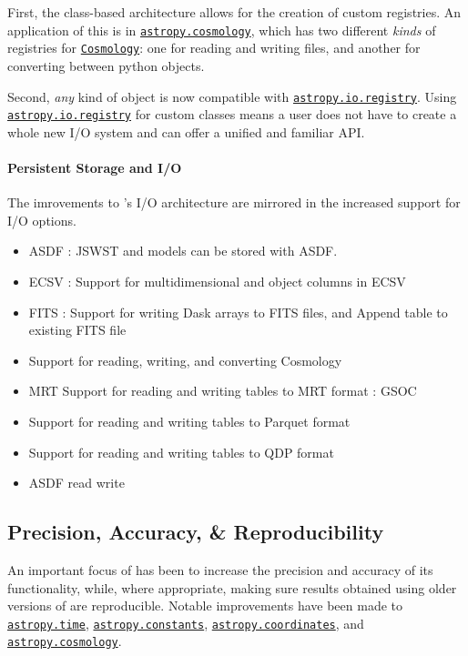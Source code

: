 \documentclass[modern]{aastex631}
\newcommand{\astropysubpkg}[1]{\href{http://docs.astropy.org/en/stable/#1/index.html}{\texttt{astropy.#1}}\xspace}
\newcommand{\astropyiosubpkg}[1]{\href{http://docs.astropy.org/en/stable/io/#1/index.html}{\texttt{astropy.io.#1}}\xspace}
\newcommand{\astropycosmology}{\astropysubpkg{cosmology}}
\newcommand{\astropycoordinates}{\astropysubpkg{coordinates}}
\newcommand{\astropyconstants}{\astropysubpkg{constants}}
\newcommand{\astropytime}{\astropysubpkg{time}}
\newcommand{\astropyapi}[2]{\href{https://docs.astropy.org/en/stable/api/astropy.#1.html}{#2}}
\newcommand{\astropyapidoc}[2]{\astropyapi{#1}{\texttt{#2}\xspace}}
\newcommand{\astropyCosmology}{\astropyapidoc{cosmology.Cosmology}{Cosmology}}
\begin{document}
    First, the class-based architecture allows for the creation of custom
    registries. An application of this is in \astropycosmology, which
    has two different \textit{kinds} of registries for \astropyCosmology: one
    for reading and writing files, and another for converting between python
    objects.

    Second, \textit{any} kind of object is now compatible with
    \astropyiosubpkg{registry}. Using \astropyiosubpkg{registry} for custom
    classes means a user does not have to create a whole new I/O system and can
    offer a unified and familiar API.

  \paragraph{Persistent Storage and I/O}

    The imrovements to \astropy's I/O architecture are mirrored in the increased support for I/O options.

    \begin{itemize}
      \item ASDF : JSWST  and models can be stored with ASDF.
      \item ECSV : Support for multidimensional and object columns in ECSV
      \item FITS : Support for writing Dask arrays to FITS files, and Append table to existing FITS file
      \item Support for reading, writing, and converting Cosmology
      \item MRT Support for reading and writing tables to MRT format : GSOC
      \item Support for reading and writing tables to Parquet format
      \item Support for reading and writing tables to QDP format
      \item ASDF read write
    \end{itemize}


\subsection*{Precision, Accuracy, \& Reproducibility} \label{sec:core-features-precision_accuracy_repreducibility}

  An important focus of \astropy has been to increase the precision and accuracy
  of its functionality, while, where appropriate, making sure results obtained
  using older versions of \astropypkg are reproducible.
  Notable improvements have been made to \astropytime, \astropyconstants,
  \astropycoordinates, and \astropycosmology.
\end{document}
